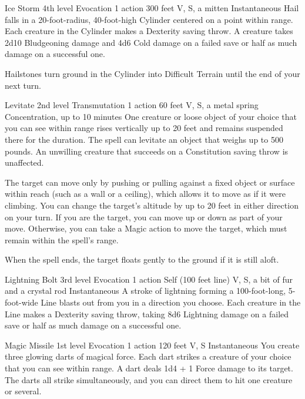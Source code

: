 \documentclass[10pt,a4paper,twoside,bg=print,twocolumn,openany,nodeprecatedcode]{dndbook}
\begin{document}


\DndSpellHeader%
{Ice Storm}
{4th level Evocation}
{1 action}
{300 feet}
{V, S, a mitten}
{Instantaneous}
Hail falls in a 20-foot-radius, 40-foot-high Cylinder centered on a point within range. Each creature in the Cylinder makes a Dexterity saving throw. A creature takes 2d10 Bludgeoning damage and 4d6 Cold damage on a failed save or half as much damage on a successful one.

Hailstones turn ground in the Cylinder into Difficult Terrain until the end of your next turn.



\DndSpellHeader%
{Levitate}
{2nd level Transmutation}
{1 action}
{60 feet}
{V, S, a metal spring}
{Concentration, up to 10 minutes}
One creature or loose object of your choice that you can see within range rises vertically up to 20 feet and remains suspended there for the duration. The spell can levitate an object that weighs up to 500 pounds. An unwilling creature that succeeds on a Constitution saving throw is unaffected.

The target can move only by pushing or pulling against a fixed object or surface within reach (such as a wall or a ceiling), which allows it to move as if it were climbing. You can change the target's altitude by up to 20 feet in either direction on your turn. If you are the target, you can move up or down as part of your move. Otherwise, you can take a Magic action to move the target, which must remain within the spell's range.

When the spell ends, the target floats gently to the ground if it is still aloft.



\DndSpellHeader%
{Lightning Bolt}
{3rd level Evocation}
{1 action}
{Self (100 feet line)}
{V, S, a bit of fur and a crystal rod}
{Instantaneous}
A stroke of lightning forming a 100-foot-long, 5-foot-wide Line blasts out from you in a direction you choose. Each creature in the Line makes a Dexterity saving throw, taking 8d6 Lightning damage on a failed save or half as much damage on a successful one.



\DndSpellHeader%
{Magic Missile}
{1st level Evocation}
{1 action}
{120 feet}
{V, S}
{Instantaneous}
You create three glowing darts of magical force. Each dart strikes a creature of your choice that you can see within range. A dart deals 1d4 + 1 Force damage to its target. The darts all strike simultaneously, and you can direct them to hit one creature or several.
\end{document}
